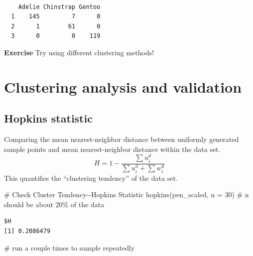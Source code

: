 \documentclass[
  letterpaper,
  DIV=11,
  numbers=noendperiod]{scrreprt}
\newenvironment{Shaded}{\begin{snugshade}}{\end{snugshade}}
\newcommand{\AttributeTok}[1]{\textcolor[rgb]{0.40,0.45,0.13}{#1}}
\newcommand{\CommentTok}[1]{\textcolor[rgb]{0.37,0.37,0.37}{#1}}
\newcommand{\DecValTok}[1]{\textcolor[rgb]{0.68,0.00,0.00}{#1}}
\newcommand{\FunctionTok}[1]{\textcolor[rgb]{0.28,0.35,0.67}{#1}}
\newcommand{\NormalTok}[1]{\textcolor[rgb]{0.00,0.23,0.31}{#1}}
\newcommand{\SpecialCharTok}[1]{\textcolor[rgb]{0.37,0.37,0.37}{#1}}
\begin{document}
\begin{Shaded}
\end{Shaded}

\begin{verbatim}
   
    Adelie Chinstrap Gentoo
  1    145         7      0
  2      1        61      0
  3      0         0    119
\end{verbatim}

\textbf{Exercise} Try using different clustering methods!

\hypertarget{clustering-analysis-and-validation}{%
\section{Clustering analysis and
validation}\label{clustering-analysis-and-validation}}

\hypertarget{hopkins-statistic}{%
\subsection{Hopkins statistic}\label{hopkins-statistic}}

Comparing the mean nearest-neighbor distance between uniformly generated
sample points and mean nearest-neighbor distance within the data set. \[
H = 1 - \frac{\sum u^d_i}{\sum u^d_i + \sum w^d_i}
\] This quantifies the ``clustering tendency'' of the data set.

\begin{Shaded}
\begin{Highlighting}[]
\CommentTok{\# Check Cluster Tendency{-}{-}Hopkins Statistic}
\FunctionTok{hopkins}\NormalTok{(pen\_scaled, }\AttributeTok{n =} \DecValTok{30}\NormalTok{) }\CommentTok{\# n should be about 20\% of the data}
\end{Highlighting}
\end{Shaded}

\begin{verbatim}
$H
[1] 0.2086479
\end{verbatim}

\begin{Shaded}
\begin{Highlighting}[]
\CommentTok{\# run a couple times to sample repeatedly}
\end{Highlighting}
\end{Shaded}
\end{document}
